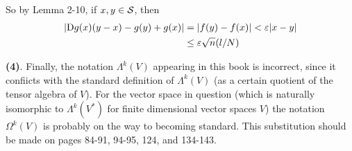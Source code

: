 So by Lemma 2-10, if $x,y\in\mathcal{S}$, then 
\begin{align*}
    |\mathrm{D}g(x)(y-x)-g(y)+g(x)|
    & = |f(y)-f(x)|<\varepsilon|x-y|\\
    & \le \varepsilon\sqrt{n}(l/N)
\end{align*}

\vspace*{1.5em}
\textbf{(4)}. Finally, the notation $\Lambda^k(V)$ appearing in this book is
incorrect, since it confiicts with the standard definition of
$\Lambda^k(V)$ (as a certain quotient of the tensor algebra of $V$).
For the vector space in question (which is naturally isomorphic to
$\Lambda^k(V^*)$ for finite dimensional vector spaces $V$) the notation
$\Omega^k(V)$ is probably on the way to becoming standard. This
substitution should be made on pages 84-91, 94-95, 124, and 134-143.
\endgroup
